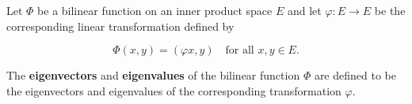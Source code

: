 Let $\Phi$ be a bilinear function on an inner product space $E$ and let $\varphi: E \rightarrow E$ be the corresponding linear transformation defined by

$$\Phi(x, y) = (\varphi x, y) \quad \text{for all } x, y \in E.$$

The \textbf{eigenvectors} and \textbf{eigenvalues} of the bilinear function $\Phi$ are defined to be the eigenvectors and eigenvalues of the corresponding transformation $\varphi$.
